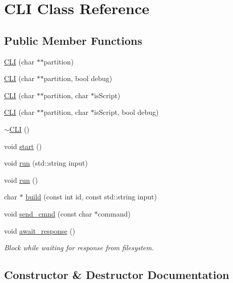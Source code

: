 \hypertarget{classCLI}{}\section{C\+LI Class Reference}
\label{classCLI}
\subsection*{Public Member Functions}
\begin{DoxyCompactItemize}
\item 
\mbox{\hyperlink{classCLI_a0c3b5662a3f33b5a76021be177c3eef2}{C\+LI}} (char $\ast$$\ast$partition)
\item 
\mbox{\hyperlink{classCLI_aeafaa56f2b2d8c97121ed52125e3fa9a}{C\+LI}} (char $\ast$$\ast$partition, bool debug)
\item 
\mbox{\hyperlink{classCLI_a4eb5e9a1c695edf4dcc705b9c12a0a8d}{C\+LI}} (char $\ast$$\ast$partition, char $\ast$is\+Script)
\item 
\mbox{\hyperlink{classCLI_a5d9746160fc642addd9b4aff6cc4eef2}{C\+LI}} (char $\ast$$\ast$partition, char $\ast$is\+Script, bool debug)
\item 
\mbox{\hyperlink{classCLI_a9f59d57abf434f7161fcf3f61b725752}{$\sim$\+C\+LI}} ()
\item 
void \mbox{\hyperlink{classCLI_a1492005f186392031bd4d447cb20e975}{start}} ()
\item 
void \mbox{\hyperlink{classCLI_a5ce3ce0818fc0afe2a277995000ea22b}{run}} (std\+::string input)
\item 
void \mbox{\hyperlink{classCLI_aeefc8cd81999836a90c2cfaced6177f1}{run}} ()
\item 
char $\ast$ \mbox{\hyperlink{classCLI_a6c3f97b04646b070ad82801adf0dc521}{build}} (const int id, const std\+::string input)
\item 
void \mbox{\hyperlink{classCLI_a1d25fcb18cf42e03a7e38c24a8ba1506}{send\+\_\+cmnd}} (const char $\ast$command)
\item 
void \mbox{\hyperlink{classCLI_a87c68e5edcb5750d1199839e6b1f843e}{await\+\_\+response}} ()
\begin{DoxyCompactList}\small\item\em Block while waiting for response from filesystem. \end{DoxyCompactList}\end{DoxyCompactItemize}


\subsection{Constructor \& Destructor Documentation}
\mbox{\label{classCLI_a0c3b5662a3f33b5a76021be177c3eef2}} 
